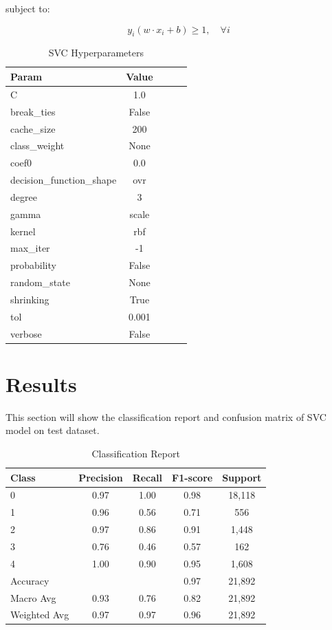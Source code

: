 \documentclass[a4paper,12pt]{article}
\begin{document}
subject to:

\begin{equation}
    y_i (w \cdot x_i + b) \geq 1, \quad \forall i
\end{equation}

\begin{table}[H]
    \centering
    \begin{tabular}{lcccc}
        \toprule
        Param & Value \\
        \midrule
        C & 1.0 \\
        break\_ties & False \\
        cache\_size & 200 \\
        class\_weight & None \\
        coef0 & 0.0 \\
        decision\_function\_shape & ovr \\
        degree & 3 \\
        gamma & scale \\
        kernel & rbf \\
        max\_iter & -1 \\
        probability & False \\
        random\_state & None \\
        shrinking & True \\
        tol & 0.001 \\
        verbose & False \\
        \bottomrule
    \end{tabular}
    \caption{SVC Hyperparameters}
    \label{tab:svc_params}
\end{table}

\section{Results}

This section will show the classification report and confusion matrix of SVC model on test dataset.

\begin{table}[H]
    \centering
    \begin{tabular}{lcccc}
        \toprule
        Class & Precision & Recall & F1-score & Support \\
        \midrule
        0 & 0.97 & 1.00 & 0.98 & 18,118 \\
        1 & 0.96 & 0.56 & 0.71 & 556 \\
        2 & 0.97 & 0.86 & 0.91 & 1,448 \\
        3 & 0.76 & 0.46 & 0.57 & 162 \\
        4 & 1.00 & 0.90 & 0.95 & 1,608 \\
        \midrule
        Accuracy &  &  & 0.97 & 21,892 \\
        Macro Avg & 0.93 & 0.76 & 0.82 & 21,892 \\
        Weighted Avg & 0.97 & 0.97 & 0.96 & 21,892 \\
        \bottomrule
    \end{tabular}
    \caption{Classification Report}
    \label{tab:classification}
\end{table}
\end{document}
